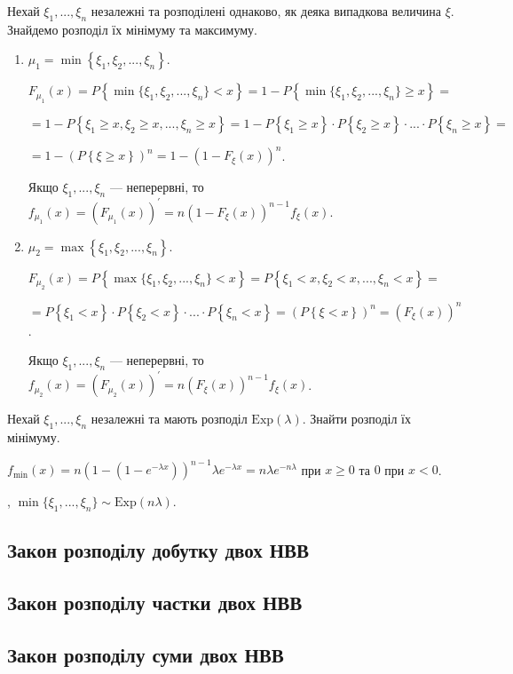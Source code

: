 Нехай $\xi_1, ..., \xi_n$ незалежні та розподілені однаково, як деяка випадкова величина $\xi$.
Знайдемо розподіл їх мінімуму та максимуму.
\begin{enumerate}
    \item $\mu_1 = \min\left\{\xi_1, \xi_2, ..., \xi_n\right\}$.

    $F_{\mu_1} (x) = P \left\{ \min\{\xi_1, \xi_2, ..., \xi_n\} < x \right\} =
    1 - P \left\{ \min\{\xi_1, \xi_2, ..., \xi_n\} \geq x \right\} =$

    $ = 1 - P \left\{ \xi_1 \geq x, \xi_2 \geq x, ..., \xi_n \geq x \right\} = 
    1 - P\left\{ \xi_1 \geq x\right\} \cdot P\left\{ \xi_2 \geq x\right\} \cdot ... \cdot P\left\{ \xi_n \geq x\right\} = $
    
    $ = 1 - (P\left\{ \xi \geq x\right\})^n = 1 - (1- F_\xi (x))^n$.

    Якщо $\xi_1, ..., \xi_n$ --- неперервні, то $f_{\mu_1} (x) = \left( F_{\mu_1} (x)\right)^\prime = n (1- F_\xi (x))^{n-1} f_\xi(x)$.
    \item $\mu_2 = \max\left\{\xi_1, \xi_2, ..., \xi_n\right\}$.

    $F_{\mu_2} (x) = P \left\{ \max\{\xi_1, \xi_2, ..., \xi_n\} < x \right\} =
    P \left\{ \xi_1 < x, \xi_2 < x, ..., \xi_n < x \right\} = $

    $ = P\left\{ \xi_1 < x\right\} \cdot P\left\{ \xi_2 < x\right\} \cdot ... \cdot P\left\{ \xi_n < x\right\} =
    (P\left\{ \xi < x\right\})^n = (F_\xi (x))^n$.

    Якщо $\xi_1, ..., \xi_n$ --- неперервні, то $f_{\mu_2} (x) = \left( F_{\mu_2} (x)\right)^\prime = n (F_\xi (x))^{n-1} f_\xi(x)$.
\end{enumerate}

\begin{example}
    Нехай $\xi_1, ..., \xi_n$ незалежні та мають розподіл $\mathrm{Exp}(\lambda)$. Знайти розподіл їх мінімуму.

    \noindent$f_{\min}(x) = n (1-(1-e^{-\lambda x}))^{n-1} \lambda e^{-\lambda x} = n \lambda e^{-n\lambda}$ при $x \geq 0$ та $0$ при $x < 0$.
    
    , $\min\{\xi_1, ..., \xi_n\} \sim \mathrm{Exp} (n \lambda)$.
\end{example}

\subsection{Закон розподілу добутку двох НВВ}

\subsection{Закон розподілу частки двох НВВ}

\subsection{Закон розподілу суми двох НВВ}